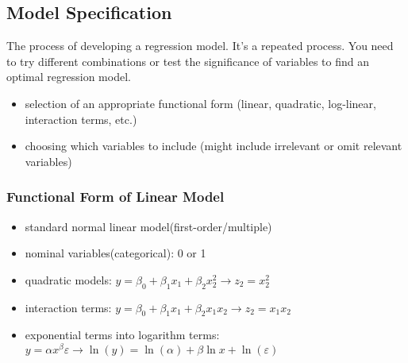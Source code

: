\subsection{Model Specification}
The process of developing a regression model. It's a repeated process. You need to try different combinations or test the significance of variables to find an optimal regression model.

\begin{itemize}
	\item selection of an appropriate functional form (linear, quadratic, log-linear, interaction terms, etc.)
	\item choosing which variables to include (might include irrelevant or omit relevant variables)
\end{itemize}

\subsubsection{Functional Form of Linear Model} 
\begin{itemize}
	\item standard normal linear model(first-order/multiple)
	\item nominal variables(categorical): 0 or 1
	\item quadratic models: $y = \beta_0 + \beta_1 x_1 + \beta_2 x_2^2 \rightarrow z_2 = x_2^2$ 
	\item interaction terms: $y = \beta_0 + \beta_1 x_1 + \beta_2 x_1x_2 \rightarrow z_2 = x_1x_2$
	\item exponential terms into logarithm terms: $y = \alpha x^{\beta}\varepsilon \rightarrow \ln(y) = \ln(\alpha) + \beta\ln{x} + \ln(\varepsilon)$
\end{itemize}

